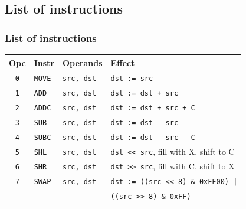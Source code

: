 \documentclass{beamer}
\begin{document}
  \subsection{List of instructions}
   \begin{frame}
    \frametitle{List of instructions}
    \begin{center}
     \begin{tabular}{|c|ll|l|}
      \hline
       Opc&Instr&Operands&Effect\\
      \hline
       {\tt 0}&{\tt MOVE}&{\tt src, dst}&{\tt dst := src}\\
       {\tt 1}&{\tt ADD}&{\tt src, dst}&{\tt dst := dst + src}\\
       {\tt 2}&{\tt ADDC}&{\tt src, dst}&{\tt dst := dst + src + C}\\
       {\tt 3}&{\tt SUB}&{\tt src, dst}&{\tt dst := dst - src}\\
       {\tt 4}&{\tt SUBC}&{\tt src, dst}&{\tt dst := dst - src - C}\\
       {\tt 5}&{\tt SHL}&{\tt src, dst}&{\tt dst << src}, fill with X, shift to C\\
       {\tt 6}&{\tt SHR}&{\tt src, dst}&{\tt dst >> src}, fill with C, shift to X\\
       {\tt 7}&{\tt SWAP}&{\tt src, dst}&{\tt dst := ((src << 8) \& 0xFF00) |}\\
              &          &              &{\tt ((src >> 8) \& 0xFF)}\\
      \hline
     \end{tabular}
    \end{center}
   \end{frame}
%
\end{document}
